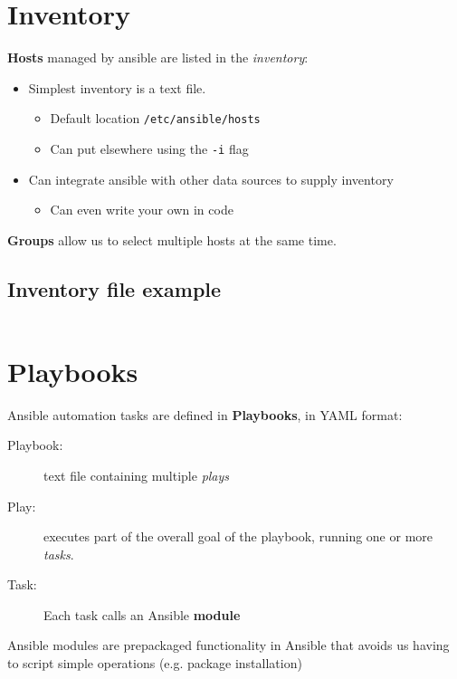 \documentclass[slides]{pgnotes}
\begin{document}
\section{Inventory}

\textbf{Hosts} managed by ansible are listed in the \textit{inventory}:

\begin{itemize}
\item Simplest inventory is a text file.
  \begin{itemize}
  \item Default location \texttt{/etc/ansible/hosts}
  \item Can put elsewhere using the \texttt{-i} flag
  \end{itemize}
\item Can integrate ansible with other data sources to supply inventory
  \begin{itemize}
  \item Can even write your own in code
  \end{itemize}
\end{itemize}

\textbf{Groups} allow us to select multiple hosts at the same time.


\subsection{Inventory file example}

\inputminted{ini}{inventory_example.ini}


\section{Playbooks}

Ansible automation tasks are defined in \textbf{Playbooks}, in YAML format:

\begin{description}
\item[Playbook:] text file containing multiple \textit{plays}
\item[Play:] executes part of the overall goal of the playbook, running one or more \textit{tasks}.
\item[Task:] Each task calls an Ansible \textbf{module}
\end{description}

Ansible modules are prepackaged functionality in Ansible that avoids us having to script simple operations (e.g. package installation)
\end{document}
